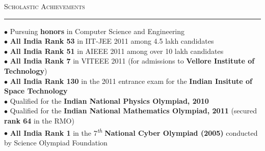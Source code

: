 \documentclass[a4paper,9pt]{article}
\begin{document}
\vspace*{4.6cm}


\Large{\textsc{Scholastic Achievements}}\vspace{1.5pt}
\hrule\vspace{0.25cm}
\normalsize
$\bullet$ Pursuing \textbf{honors} in Computer Science and Engineering\\
$\bullet$ \textbf{All India Rank 53} in IIT-JEE 2011 among 4.5 lakh candidates\\
$\bullet$ \textbf{All India Rank 51} in AIEEE 2011 among over 10 lakh candidates\\
$\bullet$ \textbf{All India Rank 7} in VITEEE 2011 (for admissions to \textbf{Vellore Institute of Technology})\\
$\bullet$ \textbf{All India Rank 130} in the 2011 entrance exam for the \textbf{Indian Insitute of Space Technology}\\
$\bullet$ Qualified for the \textbf{Indian National Physics Olympiad, 2010}\\
$\bullet$ Qualified for the \textbf{Indian National Mathematics Olympiad, 2011} (secured \textbf{rank 64} in the RMO)\\
$\bullet$ \textbf{All India Rank 1} in the 7\textsuperscript{\emph{th}} \textbf{National Cyber Olympiad (2005)} conducted by Science Olympiad Foundation\\
\end{document}
